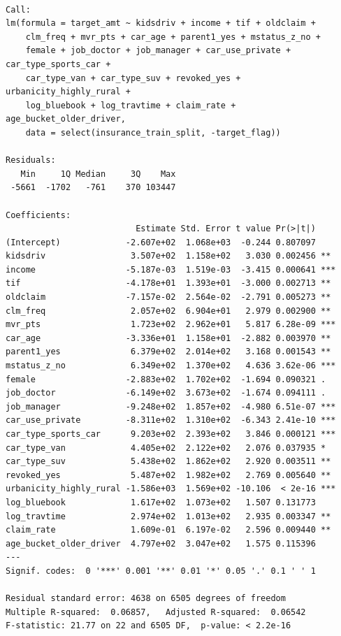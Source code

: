 \documentclass[
  11pt]{article}
\begin{document}
\begin{verbatim}

Call:
lm(formula = target_amt ~ kidsdriv + income + tif + oldclaim + 
    clm_freq + mvr_pts + car_age + parent1_yes + mstatus_z_no + 
    female + job_doctor + job_manager + car_use_private + car_type_sports_car + 
    car_type_van + car_type_suv + revoked_yes + urbanicity_highly_rural + 
    log_bluebook + log_travtime + claim_rate + age_bucket_older_driver, 
    data = select(insurance_train_split, -target_flag))

Residuals:
   Min     1Q Median     3Q    Max 
 -5661  -1702   -761    370 103447 

Coefficients:
                          Estimate Std. Error t value Pr(>|t|)    
(Intercept)             -2.607e+02  1.068e+03  -0.244 0.807097    
kidsdriv                 3.507e+02  1.158e+02   3.030 0.002456 ** 
income                  -5.187e-03  1.519e-03  -3.415 0.000641 ***
tif                     -4.178e+01  1.393e+01  -3.000 0.002713 ** 
oldclaim                -7.157e-02  2.564e-02  -2.791 0.005273 ** 
clm_freq                 2.057e+02  6.904e+01   2.979 0.002900 ** 
mvr_pts                  1.723e+02  2.962e+01   5.817 6.28e-09 ***
car_age                 -3.336e+01  1.158e+01  -2.882 0.003970 ** 
parent1_yes              6.379e+02  2.014e+02   3.168 0.001543 ** 
mstatus_z_no             6.349e+02  1.370e+02   4.636 3.62e-06 ***
female                  -2.883e+02  1.702e+02  -1.694 0.090321 .  
job_doctor              -6.149e+02  3.673e+02  -1.674 0.094111 .  
job_manager             -9.248e+02  1.857e+02  -4.980 6.51e-07 ***
car_use_private         -8.311e+02  1.310e+02  -6.343 2.41e-10 ***
car_type_sports_car      9.203e+02  2.393e+02   3.846 0.000121 ***
car_type_van             4.405e+02  2.122e+02   2.076 0.037935 *  
car_type_suv             5.438e+02  1.862e+02   2.920 0.003511 ** 
revoked_yes              5.487e+02  1.982e+02   2.769 0.005640 ** 
urbanicity_highly_rural -1.586e+03  1.569e+02 -10.106  < 2e-16 ***
log_bluebook             1.617e+02  1.073e+02   1.507 0.131773    
log_travtime             2.974e+02  1.013e+02   2.935 0.003347 ** 
claim_rate               1.609e-01  6.197e-02   2.596 0.009440 ** 
age_bucket_older_driver  4.797e+02  3.047e+02   1.575 0.115396    
---
Signif. codes:  0 '***' 0.001 '**' 0.01 '*' 0.05 '.' 0.1 ' ' 1

Residual standard error: 4638 on 6505 degrees of freedom
Multiple R-squared:  0.06857,   Adjusted R-squared:  0.06542 
F-statistic: 21.77 on 22 and 6505 DF,  p-value: < 2.2e-16
\end{verbatim}
\end{document}
